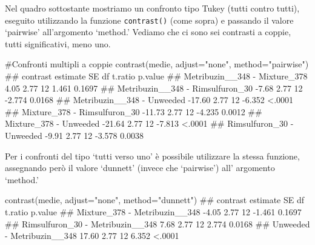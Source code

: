 \documentclass[a4paper,12pt,oneside]{book}
\newenvironment{Shaded}{\begin{snugshade}}{\end{snugshade}}
\newcommand{\StringTok}[1]{#1}
\newcommand{\CommentTok}[1]{#1}
\newcommand{\DocumentationTok}[1]{#1}
\newcommand{\FunctionTok}[1]{#1}
\newcommand{\AttributeTok}[1]{#1}
\newcommand{\NormalTok}[1]{#1}
\begin{document}
Nel quadro sottostante mostriamo un confronto tipo Tukey (tutti contro tutti), eseguito utilizzando la funzione \texttt{contrast()} (come sopra) e passando il valore `pairwise' all'argomento `method.' Vediamo che ci sono sei contrasti a coppie, tutti significativi, meno uno.

\footnotesize

\begin{Shaded}
\begin{Highlighting}[]
\CommentTok{\#Confronti multipli a coppie}
\FunctionTok{contrast}\NormalTok{(medie, }\AttributeTok{adjust=}\StringTok{"none"}\NormalTok{, }\AttributeTok{method=}\StringTok{"pairwise"}\NormalTok{)}
\DocumentationTok{\#\#  contrast                         estimate   SE df t.ratio p.value}
\DocumentationTok{\#\#  Metribuzin\_\_348 {-} Mixture\_378        4.05 2.77 12   1.461  0.1697}
\DocumentationTok{\#\#  Metribuzin\_\_348 {-} Rimsulfuron\_30    {-}7.68 2.77 12  {-}2.774  0.0168}
\DocumentationTok{\#\#  Metribuzin\_\_348 {-} Unweeded         {-}17.60 2.77 12  {-}6.352  \textless{}.0001}
\DocumentationTok{\#\#  Mixture\_378 {-} Rimsulfuron\_30       {-}11.73 2.77 12  {-}4.235  0.0012}
\DocumentationTok{\#\#  Mixture\_378 {-} Unweeded             {-}21.64 2.77 12  {-}7.813  \textless{}.0001}
\DocumentationTok{\#\#  Rimsulfuron\_30 {-} Unweeded           {-}9.91 2.77 12  {-}3.578  0.0038}
\end{Highlighting}
\end{Shaded}

\normalsize

Per i confronti del tipo `tutti verso uno' è possibile utilizzare la stessa funzione, assegnando però il valore `dunnett' (invece che `pairwise') all' argomento `method.'

\small

\begin{Shaded}
\begin{Highlighting}[]
\FunctionTok{contrast}\NormalTok{(medie, }\AttributeTok{adjust=}\StringTok{"none"}\NormalTok{, }\AttributeTok{method=}\StringTok{"dunnett"}\NormalTok{)}
\DocumentationTok{\#\#  contrast                         estimate   SE df t.ratio p.value}
\DocumentationTok{\#\#  Mixture\_378 {-} Metribuzin\_\_348       {-}4.05 2.77 12  {-}1.461  0.1697}
\DocumentationTok{\#\#  Rimsulfuron\_30 {-} Metribuzin\_\_348     7.68 2.77 12   2.774  0.0168}
\DocumentationTok{\#\#  Unweeded {-} Metribuzin\_\_348          17.60 2.77 12   6.352  \textless{}.0001}
\end{Highlighting}
\end{Shaded}
\end{document}
